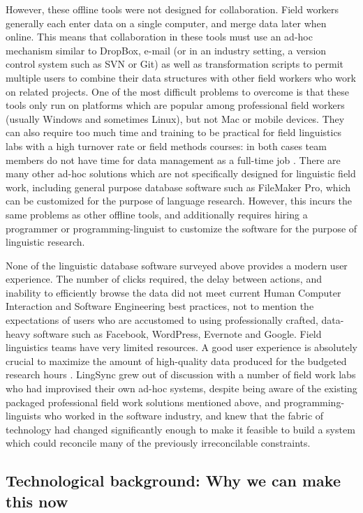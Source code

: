 \documentclass[letterpaper, 12pt, dvips]{mitwpl}
\begin{document}
However, these offline tools were not designed for collaboration. 
Field workers generally each enter data on a single computer,
and merge data later when online.
This means that collaboration in these tools must use an ad-hoc mechanism similar to DropBox, e-mail (or in an industry setting, a version control system such as SVN or Git)
as well as transformation scripts to permit multiple users to combine their data structures with other field workers who work on related projects.
One of the most difficult problems to overcome is that 
these tools only run on platforms which are popular among professional field workers  (usually Windows and sometimes Linux), but 
not Mac or mobile devices.
They can also require too much time and training to be practical for field linguistics labs with a high turnover rate or field methods courses: in both cases team members do not have time for data management as a full-time job \citep{Butler:2007}. 
There are many other ad-hoc solutions which are not specifically designed for linguistic field work, including general purpose database software such as FileMaker Pro,
which can be customized for the purpose of language research.
However,
this incurs the same problems as other offline tools, and additionally requires hiring a programmer or programming-linguist to customize the software for the purpose of linguistic research.

None of the linguistic database software surveyed above provides a modern user experience.
The number of clicks required, the delay between actions, and inability to efficiently browse the data did not meet current
Human Computer Interaction and Software Engineering best practices, 
not to mention the expectations of users who are accustomed to using professionally crafted, data-heavy software such as Facebook, WordPress, Evernote and Google. %
Field linguistics teams have very limited resources. 
A good user
experience is absolutely crucial to maximize the amount of high-quality data produced for the budgeted research hours \citep{Palmer:2009}. 
LingSync grew
out of discussion with a number of field work labs who had improvised their own ad-hoc systems, 
despite being aware of the existing packaged professional field work solutions mentioned above, 
and programming-linguists who worked in the software industry, and knew that the fabric of technology had changed significantly enough to make it feasible to build a system which could reconcile many of the previously irreconcilable constraints.


\subsection{Technological background: Why we can make this now} 
\end{document}
